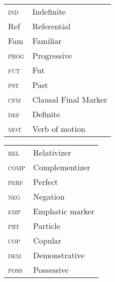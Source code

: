 \documentclass[output=paper,modfonts,nonflat,draftmode]{langsci/langscibook}
\begin{document}
\begin{tabularx}{.45\textwidth}{lQ} 
\textsc{ind} & Indefinite \\
       {Ref} & Referential \\
       {Fam} & Familiar \\
\textsc{prog} & Progressive \\
\textsc{fut} & Fut \\
\textsc{pst} & Past \\
\textsc{cfm} & Clausal Final Marker \\
\textsc{def} & Definite  \\
\textsc{mot} & Verb of motion  \\
\end{tabularx}
\begin{tabularx}{.45\textwidth}{lQ}
\textsc{rel} & Relativizer \\
\textsc{comp} & Complementizer \\
\textsc{perf} & Perfect \\
\textsc{neg} & Negation \\
\textsc{emp} & Emphatic marker \\
\textsc{prt} & Particle \\
\textsc{cop} & Copular  \\
\textsc{dem} & Demonstrative \\
\textsc{poss} & Possessive  \\
\end{tabularx}
\end{document}
